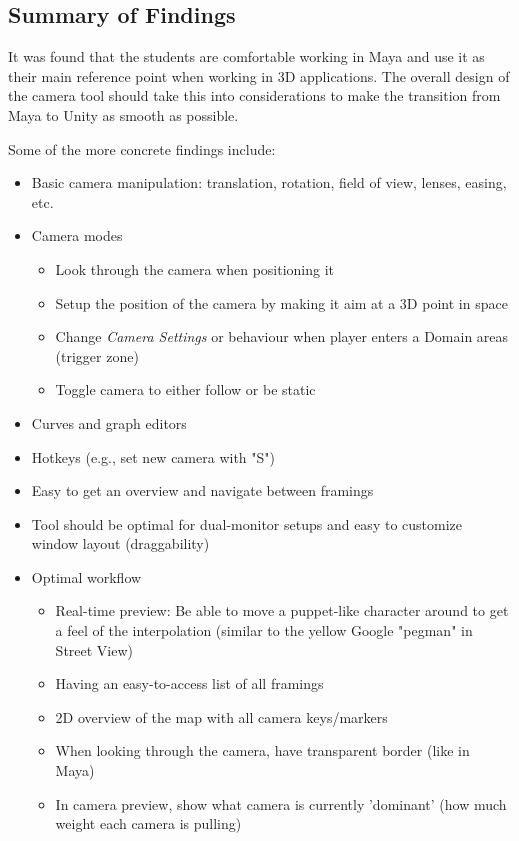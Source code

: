 

\subsection{Summary of Findings}
It was found that the students are comfortable working in Maya and use it as their main reference point when working in 3D applications. The overall design of the camera tool should take this into considerations to make the transition from Maya to Unity as smooth as possible.

Some of the more concrete findings include:

\vspace{-5mm}
\begin{itemize}
\setlength\itemsep{0em}
\item Basic camera manipulation: translation, rotation, field of view, lenses, easing, etc.
\item Camera modes
\begin{itemize}
\item Look through the camera when positioning it
\item Setup the position of the camera by making it aim at a 3D point in space
\item Change \textit{Camera Settings} or behaviour when player enters a Domain areas (trigger zone)
\item Toggle camera to either follow or be static
\end{itemize}
\item Curves and graph editors
\item Hotkeys (e.g., set new camera with "S")
\item Easy to get an overview and navigate between framings
\item Tool should be optimal for dual-monitor setups and easy to customize window layout (draggability)
\item Optimal workflow
\begin{itemize}
\item Real-time preview: Be able to move a puppet-like character around to get a feel of the interpolation (similar to the yellow Google "pegman" in Street View)
\item Having an easy-to-access list of all framings
\item 2D overview of the map with all camera keys/markers
\item When looking through the camera, have transparent border (like in Maya)
\item In camera preview, show what camera is currently 'dominant' (how much weight each camera is pulling)
\end{itemize}
\end{itemize}

